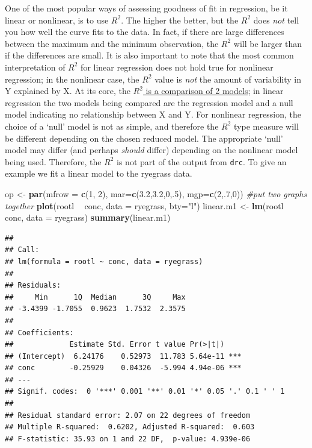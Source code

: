 \documentclass[letterpaper,]{book}
\newenvironment{Shaded}{\begin{snugshade}}{\end{snugshade}}
\newcommand{\CommentTok}[1]{\textcolor[rgb]{0.56,0.35,0.01}{\textit{#1}}}
\newcommand{\DataTypeTok}[1]{\textcolor[rgb]{0.13,0.29,0.53}{#1}}
\newcommand{\DecValTok}[1]{\textcolor[rgb]{0.00,0.00,0.81}{#1}}
\newcommand{\FloatTok}[1]{\textcolor[rgb]{0.00,0.00,0.81}{#1}}
\newcommand{\KeywordTok}[1]{\textcolor[rgb]{0.13,0.29,0.53}{\textbf{#1}}}
\newcommand{\NormalTok}[1]{#1}
\newcommand{\OperatorTok}[1]{\textcolor[rgb]{0.81,0.36,0.00}{\textbf{#1}}}
\newcommand{\StringTok}[1]{\textcolor[rgb]{0.31,0.60,0.02}{#1}}
\begin{document}
One of the most popular ways of assessing goodness of fit in regression, be it linear or nonlinear, is to use \(R^2\). The higher the better, but the \(R^2\) does \emph{not} tell you how well the curve fits to the data. In fact, if there are large differences between the maximum and the minimum observation, the \(R^2\) will be larger than if the differences are small. It is also important to note that the most common interpretation of \(R^2\) for linear regression does not hold true for nonlinear regression; in the nonlinear case, the \(R^2\) value is \emph{not} the amount of variability in Y explained by X. At its core, the \href{http://www.jstor.org/stable/2684259}{\(R^2\) is a comparison of 2 models}; in linear regression the two models being compared are the regression model and a null model indicating no relationship between X and Y. For nonlinear regression, the choice of a `null' model is not as simple, and therefore the \(R^2\) type measure will be different depending on the chosen reduced model. The appropriate `null' model may differ (and perhaps \emph{should} differ) depending on the nonlinear model being used. Therefore, the \(R^2\) is not part of the output from \texttt{drc}. To give an example we fit a linear model to the ryegrass data.



\begin{Shaded}
\begin{Highlighting}[]
\NormalTok{op <-}\StringTok{ }\KeywordTok{par}\NormalTok{(}\DataTypeTok{mfrow =} \KeywordTok{c}\NormalTok{(}\DecValTok{1}\NormalTok{, }\DecValTok{2}\NormalTok{), }\DataTypeTok{mar=}\KeywordTok{c}\NormalTok{(}\FloatTok{3.2}\NormalTok{,}\FloatTok{3.2}\NormalTok{,}\DecValTok{0}\NormalTok{,.}\DecValTok{5}\NormalTok{), }\DataTypeTok{mgp=}\KeywordTok{c}\NormalTok{(}\DecValTok{2}\NormalTok{,.}\DecValTok{7}\NormalTok{,}\DecValTok{0}\NormalTok{)) }\CommentTok{#put two graphs together}
\KeywordTok{plot}\NormalTok{(rootl }\OperatorTok{~}\StringTok{ }\NormalTok{conc, }\DataTypeTok{data =}\NormalTok{ ryegrass, }\DataTypeTok{bty=}\StringTok{"l"}\NormalTok{)}
\NormalTok{linear.m1 <-}\StringTok{ }\KeywordTok{lm}\NormalTok{(rootl }\OperatorTok{~}\StringTok{ }\NormalTok{conc, }\DataTypeTok{data =}\NormalTok{ ryegrass)}
\KeywordTok{summary}\NormalTok{(linear.m1)}
\end{Highlighting}
\end{Shaded}

\begin{verbatim}
## 
## Call:
## lm(formula = rootl ~ conc, data = ryegrass)
## 
## Residuals:
##     Min      1Q  Median      3Q     Max 
## -3.4399 -1.7055  0.9623  1.7532  2.3575 
## 
## Coefficients:
##             Estimate Std. Error t value Pr(>|t|)    
## (Intercept)  6.24176    0.52973  11.783 5.64e-11 ***
## conc        -0.25929    0.04326  -5.994 4.94e-06 ***
## ---
## Signif. codes:  0 '***' 0.001 '**' 0.01 '*' 0.05 '.' 0.1 ' ' 1
## 
## Residual standard error: 2.07 on 22 degrees of freedom
## Multiple R-squared:  0.6202, Adjusted R-squared:  0.603 
## F-statistic: 35.93 on 1 and 22 DF,  p-value: 4.939e-06
\end{verbatim}
\end{document}
